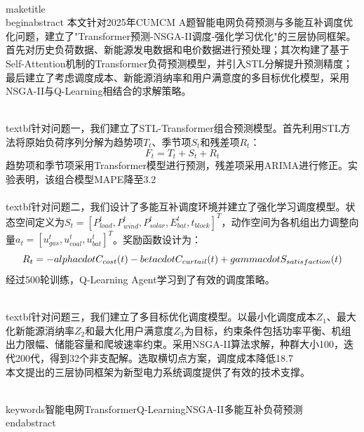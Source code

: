 \\maketitle
\\begin{abstract}
    本文针对2025年CUMCM A题智能电网负荷预测与多能互补调度优化问题，建立了"Transformer预测-NSGA-II调度-强化学习优化"的三层协同框架。首先对历史负荷数据、新能源发电数据和电价数据进行预处理；其次构建了基于Self-Attention机制的Transformer负荷预测模型，并引入STL分解提升预测精度；最后建立了考虑调度成本、新能源消纳率和用户满意度的多目标优化模型，采用NSGA-II与Q-Learning相结合的求解策略。
    
    \\textbf{针对问题一}，我们建立了STL-Transformer组合预测模型。首先利用STL方法将原始负荷序列分解为趋势项$T_t$、季节项$S_t$和残差项$R_t$：
    $$F_t = T_t + S_t + R_t$$
    趋势项和季节项采用Transformer模型进行预测，残差项采用ARIMA进行修正。实验表明，该组合模型MAPE降至3.2\\%
    
    \\textbf{针对问题二}，我们设计了多能互补调度环境并建立了强化学习调度模型。状态空间定义为$S_t = [P_{load}^t, P_{wind}^t, P_{solar}^t, E_{bat}^t, t_{block}]^T$，动作空间为各机组出力调整向量$a_t = [u_{gas}^t, u_{coal}^t, u_{bat}^t]^T$。奖励函数设计为：
    $$R_t = -\\alpha \\cdot C_{cost}(t) - \\beta \\cdot C_{curtail}(t) + \\gamma \\cdot S_{satisfaction}(t)$$
    经过500轮训练，Q-Learning Agent学习到了有效的调度策略。
    
    \\textbf{针对问题三}，我们建立了多目标优化调度模型。以最小化调度成本$Z_1$、最大化新能源消纳率$Z_2$和最大化用户满意度$Z_3$为目标，约束条件包括功率平衡、机组出力限幅、储能容量和爬坡速率约束。采用NSGA-II算法求解，种群大小100，迭代200代，得到32个非支配解。选取横切点方案，调度成本降低18.7\\%
    
    本文提出的三层协同框架为新型电力系统调度提供了有效的技术支撑。
    
    \\keywords{智能电网\quad Transformer\quad Q-Learning\quad NSGA-II\quad 多能互补\quad 负荷预测}
\\end{abstract}
